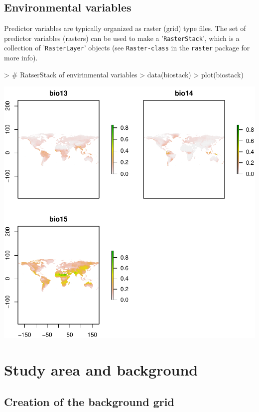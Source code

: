 \documentclass[10pt,a4paper]{report}
\begin{document}
\section{Environmental variables}

Predictor variables are typically organized as raster (grid) type files. The set of predictor variables (rasters) can be used to make a '\texttt{RasterStack}', which is a collection of '\texttt{RasterLayer}' objects (see \texttt{Raster-class} in the \texttt{raster} package for more info). 

\begin{Schunk}
\begin{Sinput}
> # RatserStack of envirinmental variables
> data(biostack)
> plot(biostack)
\end{Sinput}
\end{Schunk}
\includegraphics{mopa-mopa3}

\chapter{Study area and background}

\section{Creation of the background grid}
\end{document}
